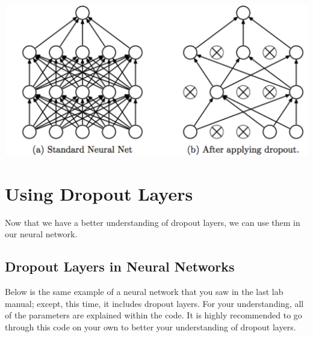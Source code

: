 \documentclass[11pt]{report}
\begin{document}
\begin{center}
    \includegraphics[scale=0.2]{./images/dropoutexample.png}
\end{center}

\chapter{Using Dropout Layers}
Now that we have a better understanding of dropout layers, we can use them in our neural network.


\section{Dropout Layers in Neural Networks}
Below is the same example of a neural network that you saw in the last lab manual; except, this time, it includes dropout layers. For your understanding, all of the parameters are explained within the code. It is highly recommended to go through this code on your own to better your understanding of dropout layers.
\end{document}
